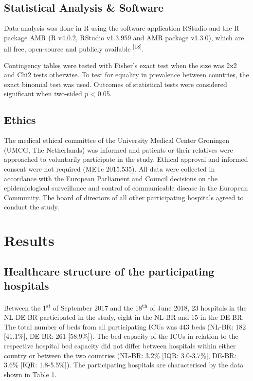 \documentclass[
]{book}
\begin{document}
\hypertarget{statistical-analysis-software}{%
\subsection{Statistical Analysis \& Software}\label{statistical-analysis-software}}

Data analysis was done in R using the software application RStudio and the R package AMR (R v4.0.2, RStudio v1.3.959 and AMR package v1.3.0), which are all free, open-source and publicly available \textsuperscript{{[}18{]}}.

Contingency tables were tested with Fisher's exact test when the size was 2x2 and Chi2 tests otherwise. To test for equality in prevalence between countries, the exact binomial test was used. Outcomes of statistical tests were considered significant when two-sided \emph{p} \textless{} 0.05.

\hypertarget{ethics}{%
\subsection{Ethics}\label{ethics}}

The medical ethical committee of the University Medical Center Groningen (UMCG, The Netherlands) was informed and patients or their relatives were approached to voluntarily participate in the study. Ethical approval and informed consent were not required (METc 2015.535). All data were collected in accordance with the European Parliament and Council decisions on the epidemiological surveillance and control of communicable disease in the European Community. The board of directors of all other participating hospitals agreed to conduct the study.

\hypertarget{results-5}{%
\section{Results}\label{results-5}}

\hypertarget{healthcare-structure-of-the-participating-hospitals}{%
\subsection{Healthcare structure of the participating hospitals}\label{healthcare-structure-of-the-participating-hospitals}}

Between the 1\textsuperscript{st} of September 2017 and the 18\textsuperscript{th} of June 2018, 23 hospitals in the NL-DE-BR participated in the study, eight in the NL-BR and 15 in the DE-BR. The total number of beds from all participating ICUs was 443 beds (NL-BR: 182 {[}41.1\%{]}, DE-BR: 261 {[}58.9\%{]}). The bed capacity of the ICUs in relation to the respective hospital bed capacity did not differ between hospitals within either country or between the two countries (NL-BR: 3.2\% {[}IQR: 3.0-3.7\%{]}, DE-BR: 3.6\% {[}IQR: 1.8-5.5\%{]}). The participating hospitals are characterised by the data shown in Table 1.
\end{document}
